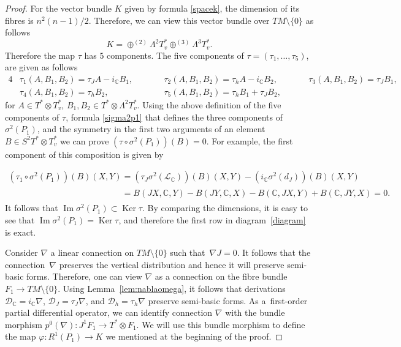 \documentclass[pdftex]{sigma}
\numberwithin{equation}{section}
\begin{document}
\begin{proof}
For the vector bundle $K$ given by formula \eqref{spacek}, the
dimension of its f\/ibres is $n^2(n-1)/2$. Therefore, we can view this
vector bundle over $TM\setminus\{0\}$ as follows
\[
K=\oplus^{(2)}\Lambda^2T^*_v \oplus^{(3)}\Lambda^3T^*_v.
\]
Therefore the map $\tau$ has $5$ components.
The f\/ive components of $\tau=(\tau_1,\dots , \tau_5)$, are given as
follows
\begin{alignat*}{4}
& \tau_{1}(A,B_1,B_2) = \tau_JA - i_{\mathbb{C}}B_1, \qquad &&
\tau_{2}(A,B_1,B_2) = \tau_hA - i_{\mathbb{C}}B_2, \qquad &&
\tau_{3}(A,B_1,B_2) = \tau_JB_1,&  \\
& \tau_{4}(A,B_1,B_2) = \tau_hB_2, \qquad &&
\tau_{5}(A,B_1,B_2) = \tau_hB_1+\tau_JB_2, &&&
\end{alignat*}
for $A\in T^*\otimes T^*_v$, $B_1, B_2 \in T^*\otimes
\Lambda^2T^*_v$. Using the above def\/inition of the f\/ive components of $\tau$,
formula \eqref{sigma2p1} that def\/ines the three components of
$\sigma^2(P_1)$, and the symmetry in the f\/irst two arguments of an
element $B\in S^2T^*\otimes T^*_v$ we can prove $\left(\tau\circ
\sigma^2(P_1)\right)(B)=0$. For example, the f\/irst component of this
composition is given by {\sloppy
\begin{gather*}
\left(\tau_1\circ \sigma^2(P_1)\right)(B)(X,Y)  =
\left(\tau_J\sigma^2({\mathcal{L}_{\mathbb{C}}})\right)(B)(X,Y)-
\left(i_{\mathbb{C}}\sigma^2(d_J)\right)(B)(X,Y)\\
 \phantom{\left(\tau_1\circ \sigma^2(P_1)\right)(B)(X,Y)}{}
 = B(JX, \mathbb{C}, Y)- B(JY, \mathbb{C}, X) - B(\mathbb{C}, JX, Y)+ B(\mathbb{C}, JY, X)=0.\!
\end{gather*} It follows that $\operatorname{Im} \sigma^2(P_1)
\subset \operatorname{Ker} \tau $. By comparing the dimensions, it
is easy to see that  \mbox{$\operatorname{Im} \sigma^2(P_1) =
\operatorname{Ker} \tau $}, and therefore the f\/irst row in diagram~\eqref{diagram} is exact.

}

Consider $\nabla$ a linear connection on $TM\setminus\{0\}$ such
that~$\nabla J=0$. It follows that the connection~$\nabla$ preserves
the vertical distribution and hence it will preserve semi-basic
forms. Therefore, one can view $\nabla$ as a connection on the
f\/ibre bundle $F_1\to TM\setminus\{0\}$.  Using Lemma~\ref{lem:nablaomega}, it follows that derivations
$\mathcal{D}_{\mathbb{C}}=i_{\mathbb{C}}\nabla$,
$\mathcal{D}_{J}=\tau_{J}\nabla$, and $\mathcal{D}_{h}=\tau_{h}\nabla$
preserve semi-basic forms. As a~f\/irst-order partial
dif\/ferential operator, we can identify connection $\nabla$ with
the bundle morphism $p^0(\nabla): J^1F_1 \to T^*\otimes F_1$.
We will use this bundle morphism to def\/ine the map $\varphi: R^1(P_1)
\to K$ we mentioned at the beginning of the proof.


\end{proof}
\end{document}
